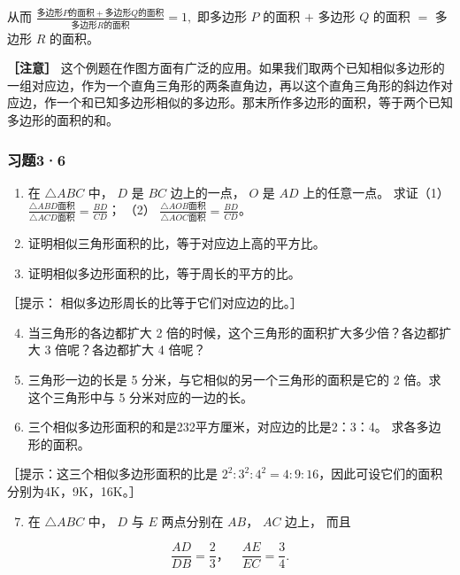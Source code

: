 从而
\(\frac{\text{多边形} P \text{的面积} + \text{多边形} Q \text{的面积}}{\text{多边形} R \text{的面积}} = 1,\)
即多边形 \(P\) 的面积 \(+\) 多边形 \(Q\) 的面积 \(=\) 多边形 \(R\)
的面积。

\textbf{［注意］}
这个例题在作图方面有广泛的应用。如果我们取两个已知相似多边形的一组对应边，作为一个直角三角形的两条直角边，再以这个直角三角形的斜边作对应边，作一个和已知多边形相似的多边形。那末所作多边形的面积，等于两个已知多边形的面积的和。

\subsubsection{习题3·6}

\begin{enumerate}
\item
  在 \(\triangle ABC\) 中， \(D\) 是 \(BC\) 边上的一点， \(O\) 是 \(AD\)
  上的任意一点。 求证（1）
  \(\frac{\triangle ABD\text{面积}}{\triangle ACD\text{面积}} = \frac{BD}{CD}\)；
  （2）
  \(\frac{\triangle AOB\text{面积}}{\triangle AOC\text{面积}} = \frac{BD}{CD}\)。
\item
  证明相似三角形面积的比，等于对应边上高的平方比。
\item
  证明相似多边形面积的比，等于周长的平方的比。
\end{enumerate}

［提示： 相似多边形周长的比等于它们对应边的比。］

\begin{enumerate}
\setcounter{enumi}{3}
\item
  当三角形的各边都扩大 2
  倍的时候，这个三角形的面积扩大多少倍？各边都扩大 3 倍呢？各边都扩大 4
  倍呢？
\item
  三角形一边的长是 5 分米，与它相似的另一个三角形的面积是它的 2
  倍。求这个三角形中与 5 分米对应的一边的长。
\item
  三个相似多边形面积的和是232平方厘米，对应边的比是2：3：4。
  求各多边形的面积。
\end{enumerate}

［提示：这三个相似多边形面积的比是
\(2^{2}:3^{2}:4^{2}=4:9:16\)，因此可设它们的面积分别为4K，9K，16K。］

\begin{enumerate}
\setcounter{enumi}{6}
\item
  在 \(\triangle ABC\) 中， \(D\) 与 \(E\) 两点分别在 \(AB\)， \(AC\)
  边上， 而且
\end{enumerate}

\[
\frac {A D}{D B} = \frac {2}{3}\text{，} \quad \frac {A E}{E C} = \frac {3}{4}.
\]


